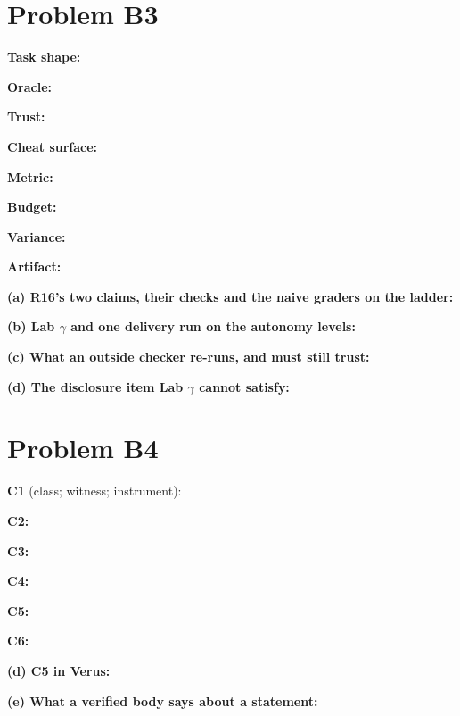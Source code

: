 \documentclass[11pt]{article}
\begin{document}
\section*{Problem B3}\label{ans:B3}
\begin{answer}
\textbf{Task shape:} \vspace{1cm}

\textbf{Oracle:} \vspace{1cm}

\textbf{Trust:} \vspace{1cm}

\textbf{Cheat surface:} \vspace{1cm}

\textbf{Metric:} \vspace{1cm}

\textbf{Budget:} \vspace{1cm}

\textbf{Variance:} \vspace{1cm}

\textbf{Artifact:} \vspace{1cm}

\textbf{(a) R16's two claims, their checks and the naive graders on the
ladder:} \vspace{2cm}

\textbf{(b) Lab $\gamma$ and one delivery run on the autonomy levels:}
\vspace{1.5cm}

\textbf{(c) What an outside checker re-runs, and must still trust:}
\vspace{2cm}

\textbf{(d) The disclosure item Lab $\gamma$ cannot satisfy:} \vspace{1cm}
\end{answer}
\section*{Problem B4}\label{ans:B4}
\begin{answer}
\textbf{C1} (class; witness; instrument): \vspace{1.5cm}

\textbf{C2:} \vspace{1.5cm}

\textbf{C3:} \vspace{1.5cm}

\textbf{C4:} \vspace{1.5cm}

\textbf{C5:} \vspace{1.5cm}

\textbf{C6:} \vspace{1.5cm}

\textbf{(d) C5 in Verus:} \vspace{1.5cm}

\textbf{(e) What a verified body says about a statement:} \vspace{1.5cm}
\end{answer}
\end{document}
